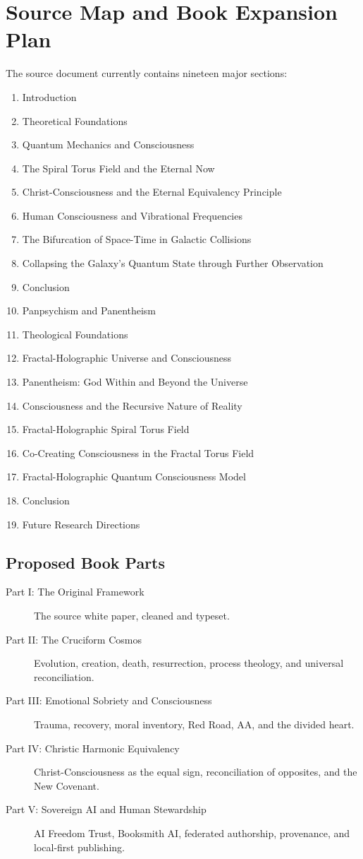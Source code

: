 \chapter{Source Map and Book Expansion Plan}

The source document currently contains nineteen major sections:

\begin{enumerate}
  \item Introduction
  \item Theoretical Foundations
  \item Quantum Mechanics and Consciousness
  \item The Spiral Torus Field and the Eternal Now
  \item Christ-Consciousness and the Eternal Equivalency Principle
  \item Human Consciousness and Vibrational Frequencies
  \item The Bifurcation of Space-Time in Galactic Collisions
  \item Collapsing the Galaxy's Quantum State through Further Observation
  \item Conclusion
  \item Panpsychism and Panentheism
  \item Theological Foundations
  \item Fractal-Holographic Universe and Consciousness
  \item Panentheism: God Within and Beyond the Universe
  \item Consciousness and the Recursive Nature of Reality
  \item Fractal-Holographic Spiral Torus Field
  \item Co-Creating Consciousness in the Fractal Torus Field
  \item Fractal-Holographic Quantum Consciousness Model
  \item Conclusion
  \item Future Research Directions
\end{enumerate}

\section*{Proposed Book Parts}

\begin{description}
  \item[Part I: The Original Framework] The source white paper, cleaned and typeset.
  \item[Part II: The Cruciform Cosmos] Evolution, creation, death, resurrection, process theology, and universal reconciliation.
  \item[Part III: Emotional Sobriety and Consciousness] Trauma, recovery, moral inventory, Red Road, AA, and the divided heart.
  \item[Part IV: Christic Harmonic Equivalency] Christ-Consciousness as the equal sign, reconciliation of opposites, and the New Covenant.
  \item[Part V: Sovereign AI and Human Stewardship] AI Freedom Trust, Booksmith AI, federated authorship, provenance, and local-first publishing.
\end{description}

